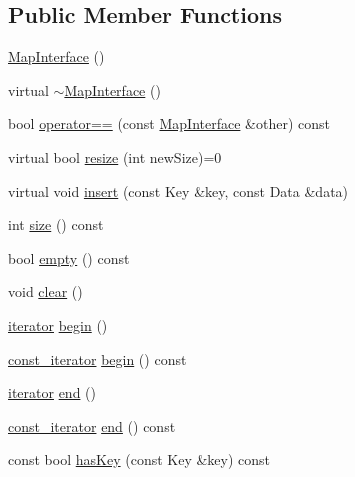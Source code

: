 \subsection*{Public Member Functions}
\begin{CompactItemize}
\item 
\hyperlink{class_j_g_t_l_1_1_map_interface_6d49e996123c82dbc4ac2b526de5225d}{Map\-Interface} ()
\item 
virtual \hyperlink{class_j_g_t_l_1_1_map_interface_f6fd6f5a7643f34cae4b7b67ba98a832}{$\sim$Map\-Interface} ()
\item 
bool \hyperlink{class_j_g_t_l_1_1_map_interface_2f61fdf95543ba566256642eeed659f4}{operator==} (const \hyperlink{class_j_g_t_l_1_1_map_interface}{Map\-Interface} \&other) const 
\item 
virtual bool \hyperlink{class_j_g_t_l_1_1_map_interface_177b75de36104c54e53080db65b777a2}{resize} (int new\-Size)=0
\item 
virtual void \hyperlink{class_j_g_t_l_1_1_map_interface_e416f8f15a065ea183c289932ef794c6}{insert} (const Key \&key, const Data \&data)
\item 
int \hyperlink{class_j_g_t_l_1_1_map_interface_416044d92d5c6d09ed79d13a775ba222}{size} () const
\item 
bool \hyperlink{class_j_g_t_l_1_1_map_interface_66e2355bebebd18fca84dee62e0fffa5}{empty} () const
\item 
void \hyperlink{class_j_g_t_l_1_1_map_interface_af2d3667a3a9cf577177720e2b757d03}{clear} ()
\item 
\hyperlink{class_j_g_t_l_1_1_map_interface_a8fcdbd899d0df84ce1aaa67d8dc000e}{iterator} \hyperlink{class_j_g_t_l_1_1_map_interface_b75e298063852903c54de5c9d17a2302}{begin} ()
\item 
\hyperlink{class_j_g_t_l_1_1_map_interface_bbce6cc516069a5a504e0ae5b9aecd88}{const\_\-iterator} \hyperlink{class_j_g_t_l_1_1_map_interface_38bbeb2dba7c6b3d8a8a2e6f441b1757}{begin} () const
\item 
\hyperlink{class_j_g_t_l_1_1_map_interface_a8fcdbd899d0df84ce1aaa67d8dc000e}{iterator} \hyperlink{class_j_g_t_l_1_1_map_interface_b942b543e93621e8e6a84c8fcadb29fc}{end} ()
\item 
\hyperlink{class_j_g_t_l_1_1_map_interface_bbce6cc516069a5a504e0ae5b9aecd88}{const\_\-iterator} \hyperlink{class_j_g_t_l_1_1_map_interface_8ce89dcb9cfb3d23d7123a8e7ad98633}{end} () const
\item 
const bool \hyperlink{class_j_g_t_l_1_1_map_interface_6a4c3571cb30d168d4a67dd2655a6b77}{has\-Key} (const Key \&key) const 

\end{CompactItemize}

